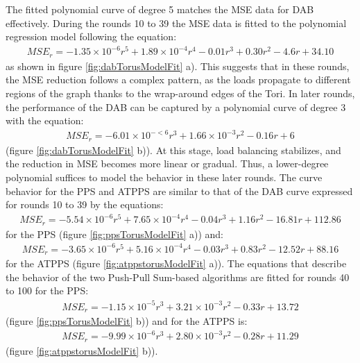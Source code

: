 The fitted polynomial curve of degree 5 matches the MSE data for DAB effectively. During the rounds 10 to 39 the MSE data is fitted to the polynomial regression model following the equation: 
\begin{align}
    MSE_r=-1.35\times 10^{-6}r^{5}+ 1.89\times 10^{-4}r^{4}-0.01r^{3}+0.30r^{2}-4.6r+34.10    
\end{align}
as shown in figure \ref{fig:dabTorusModelFit} a). This suggests that in these rounds, the MSE reduction follows a complex pattern, as the loads propagate to different regions of the graph thanks to the wrap-around edges of the Tori. In later rounds, the performance of the DAB can be captured by a polynomial curve of degree 3 with the equation:
\begin{align}
    MSE_r=-6.01\times 10^{-<6}r^{3}+1.66\times 10^{-3}r^{2}-0.16r+6    
\end{align}
(figure \ref{fig:dabTorusModelFit} b)). At this stage, load balancing stabilizes, and the reduction in MSE becomes more linear or gradual. Thus, a lower-degree polynomial suffices to model the behavior in these later rounds. The curve behavior for the PPS and ATPPS are similar to that of the DAB curve expressed for rounds 10 to 39 by the equations:
\begin{align}
    MSE_r=-5.54\times 10^{-6}r^{5}+7.65\times 10^{-4}r^{4}-0.04r^{3}+1.16r^{2}-16.81r+112.86    
\end{align}
for the PPS (figure \ref{fig:ppsTorusModelFit} a)) and:
\begin{align}
    MSE_r = -3.65 \times 10^{-6}r^{5} + 5.16 \times 10^{-4}r^{4} - 0.03r^{3} + 0.83r^{2} - 12.52r + 88.16    
\end{align}
for the ATPPS (figure \ref{fig:atppstorusModelFit} a)). The equations that describe the behavior of the two Push-Pull Sum-based algorithms are fitted for rounds 40 to 100 for the PPS: 
\begin{align}
    MSE_r = -1.15 \times 10^{-5}r^{3} + 3.21\times 10^{-3}r^{2} - 0.33r + 13.72    
\end{align}
(figure \ref{fig:ppsTorusModelFit} b)) and for the ATPPS is:
\begin{align}
    MSE_r = -9.99 \times 10^{-6}r^{3} + 2.80\times 10^{-3}r^{2} - 0.28r + 11.29    
\end{align}
(figure \ref{fig:atppstorusModelFit} b)).

